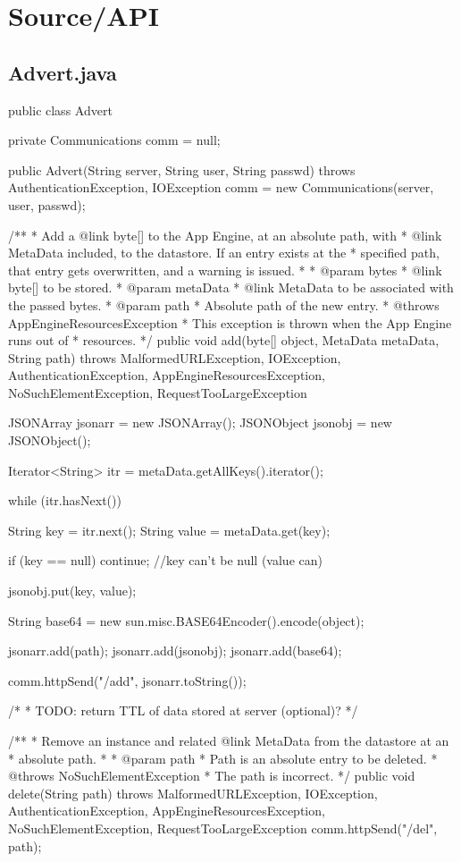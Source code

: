 \section{Source/API}
\label{src-api}
\subsection{Advert.java}
\begin{code}
public class Advert {
	
	private Communications comm = null;
	
	public Advert(String server, String user, String passwd) 
	  throws AuthenticationException, IOException {
		comm = new Communications(server, user, passwd);
	}
	
	/**
	 * Add a {@link byte}[] to the App Engine, at an absolute path, with
	 * {@link MetaData} included, to the datastore. If an entry exists at the
	 * specified path, that entry gets overwritten, and a warning is issued.
	 * 
	 * @param bytes
	 *            {@link byte}[] to be stored.
	 * @param metaData
	 *            {@link MetaData} to be associated with the passed bytes.
	 * @param path
	 *            Absolute path of the new entry.
	 * @throws AppEngineResourcesException
	 *             This exception is thrown when the App Engine runs out of
	 *             resources.
	 */
	public void add(byte[] object, MetaData metaData, String path) 
	  throws MalformedURLException, IOException, AuthenticationException,
	  AppEngineResourcesException, NoSuchElementException, 
	  RequestTooLargeException {
		JSONArray  jsonarr = new JSONArray();
		JSONObject jsonobj = new JSONObject();

		Iterator<String> itr  = metaData.getAllKeys().iterator();
	
		while (itr.hasNext()) {
			String key   = itr.next();
			String value = metaData.get(key);

			if (key == null) {
				continue; //key can't be null (value can)
			}
			
			jsonobj.put(key, value);
		}
		
		String base64 = new sun.misc.BASE64Encoder().encode(object);
		
		jsonarr.add(path);
		jsonarr.add(jsonobj);
		jsonarr.add(base64);
		
		comm.httpSend("/add", jsonarr.toString());
		
        /*
         * TODO: return TTL of data stored at server (optional)?
         */
	}
	

	/**
	 * Remove an instance and related {@link MetaData} from the datastore at an
	 * absolute path.
	 * 
	 * @param path
	 *            Path is an absolute entry to be deleted.
	 * @throws NoSuchElementException
	 *             The path is incorrect.
	 */
	public void delete(String path) 
	  throws MalformedURLException, IOException, AuthenticationException,
	  AppEngineResourcesException, NoSuchElementException, 
	  RequestTooLargeException {
		comm.httpSend("/del", path);
	}

}
\end{code}
